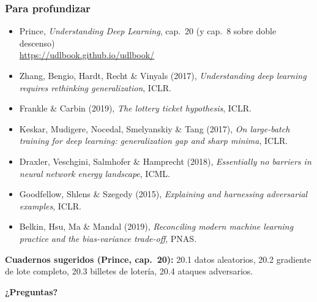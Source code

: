\documentclass[aspectratio=169, 10pt]{beamer}
\begin{document}
\begin{frame}
\frametitle{Para profundizar}
\begin{itemize}
	\item Prince, \emph{Understanding Deep Learning}, cap.~20 (y cap.~8 sobre doble descenso)\\ \url{https://udlbook.github.io/udlbook/}
	\item Zhang, Bengio, Hardt, Recht \& Vinyals (2017), \emph{Understanding deep learning requires rethinking generalization}, ICLR.
	\item Frankle \& Carbin (2019), \emph{The lottery ticket hypothesis}, ICLR.
	\item Keskar, Mudigere, Nocedal, Smelyanskiy \& Tang (2017), \emph{On large-batch training for deep learning: generalization gap and sharp minima}, ICLR.
	\item Draxler, Veschgini, Salmhofer \& Hamprecht (2018), \emph{Essentially no barriers in neural network energy landscape}, ICML.
	\item Goodfellow, Shlens \& Szegedy (2015), \emph{Explaining and harnessing adversarial examples}, ICLR.
	\item Belkin, Hsu, Ma \& Mandal (2019), \emph{Reconciling modern machine learning practice and the bias-variance trade-off}, PNAS.
\end{itemize}
\vspace{0.3em}
\footnotesize
\textbf{Cuadernos sugeridos (Prince, cap.~20):} 20.1 datos aleatorios, 20.2 gradiente de lote completo, 20.3 billetes de loter\'ia, 20.4 ataques adversarios.
\vspace{0.4em}
\begin{center}
\Large \textbf{¿Preguntas?}
\end{center}
\end{frame}
\end{document}
